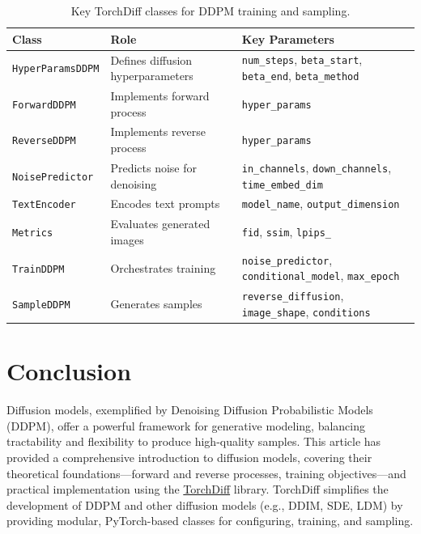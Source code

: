 \documentclass[12pt]{article}
\begin{document}
\begin{table}[htbp]
    \centering
    \caption{Key TorchDiff classes for DDPM training and sampling.}
    \label{tab:torchdiff_components}
    \scriptsize
    \begin{tabular}{p{3cm}|p{4.5cm}|p{8.5cm}}
        \hline
        \textbf{Class} & \textbf{Role} & \textbf{Key Parameters} \\
        \hline
        \texttt{HyperParamsDDPM} & Defines diffusion hyperparameters & \texttt{num\_steps}, \texttt{beta\_start}, \texttt{beta\_end}, \texttt{beta\_method} \\
        \texttt{ForwardDDPM} & Implements forward process & \texttt{hyper\_params} \\
        \texttt{ReverseDDPM} & Implements reverse process & \texttt{hyper\_params} \\
        \texttt{NoisePredictor} & Predicts noise for denoising & \texttt{in\_channels}, \texttt{down\_channels}, \texttt{time\_embed\_dim} \\
        \texttt{TextEncoder} & Encodes text prompts & \texttt{model\_name}, \texttt{output\_dimension} \\
        \texttt{Metrics} & Evaluates generated images & \texttt{fid}, \texttt{ssim}, \texttt{lpips\_} \\
        \texttt{TrainDDPM} & Orchestrates training & \texttt{noise\_predictor}, \texttt{conditional\_model}, \texttt{max\_epoch} \\
        \texttt{SampleDDPM} & Generates samples & \texttt{reverse\_diffusion}, \texttt{image\_shape}, \texttt{conditions} \\
        \hline
    \end{tabular}
\end{table}


\section{Conclusion}
\label{sec:conclusion}

Diffusion models, exemplified by Denoising Diffusion Probabilistic Models (DDPM), offer a powerful framework for generative modeling, balancing tractability and flexibility to produce high-quality samples. This article has provided a comprehensive introduction to diffusion models, covering their theoretical foundations—forward and reverse processes, training objectives—and practical implementation using the \href{https://github.com/LoqmanSamani/TorchDiff}{TorchDiff} library. TorchDiff simplifies the development of DDPM and other diffusion models (e.g., DDIM, SDE, LDM) by providing modular, PyTorch-based classes for configuring, training, and sampling.
\end{document}
